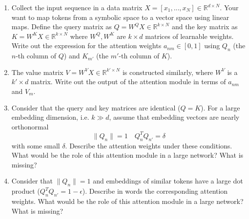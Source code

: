 \documentclass[11pt]{article}
\begin{document}
\begin{enumerate}[label=(\Alph*)]
    \item Collect the input sequence in a data matrix $X = [x_1, ..., x_N] \in \mathbb{R}^{d \times N} $. 
    Your want to map tokens from a symbolic space to a vector space using linear maps.
    Define the query matrix as $ Q = W^Q X \in \mathbb{R}^{k \times N} $ and the key matrix as $ K = W^K X \in \mathbb{R}^{k \times N} $ 
    where $ W^Q, W^K $ are $k \times d$ matrices of learnable weights. 
    Write out the expression for the attention weights $a_{nm} \in [0,1]$ using $Q_n$ (the $n$-th column of $Q$)
    and $K_{m'}$ (the $m'$-th column of $K$). 

    \item The value matrix $ V = W^V X \in \mathbb{R}^{k' \times N} $ is constructed similarly, where $ W^V $ is a $k' \times d$ matrix. 
    Write out the output of the attention module in terms of $ a_{nm} $ and $ V_{m} $.  

    \item Consider that the query and key matrices are identical ($Q=K$). 
    For a large embedding dimension, i.e. $k \gg d$, assume that embedding vectors are nearly orthonormal
    \[
        \| Q_n \| = 1 \quad Q_n^T Q_{n'} = \delta 
    \]
    with some small $\delta$. Describe the attention weights under these conditions. 
    What would be the role of this attention module in a large network? What is missing?
   
    \item Consider that $\| Q_n \|=1$ and embeddings of similar tokens have a large dot product ($Q_n^T Q_{n'}=1-\epsilon$).
    Describe in words the corresponding attention weights. What would be the role of this attention module in a large network? What is missing?  
    
\end{enumerate}
\end{document}

